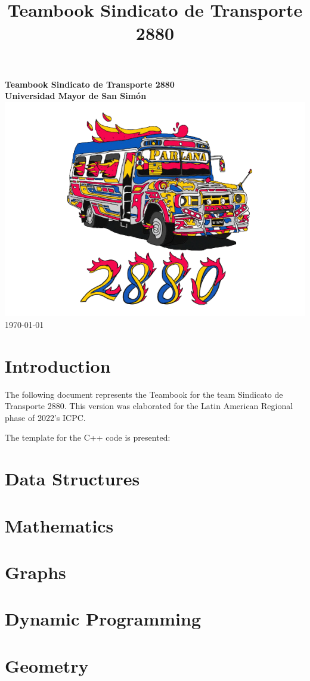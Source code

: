 \documentclass[landscape,twocolumn, 7pt, letterpaper]{book}
\begin{document}
\title{Teambook Sindicato de Transporte 2880}
\begin{titlepage}
  \centering
  \vfill
  {\bfseries\Huge
  Teambook Sindicato de Transporte 2880\\
  \vspace{2cm}
  Universidad Mayor de San Simón\\
  }    
  \vfill
  \includegraphics[width=14cm]{../Figures/LogoSdT2880.png} %
  \vfill
  \LARGE{\today}
\end{titlepage}

\tableofcontents

\chapter{Introduction}

The following document represents the Teambook for the team Sindicato de Transporte 2880. This version was elaborated for the Latin American Regional phase of 2022's ICPC.

The template for the C++ code is presented:



\chapter{Data Structures}




\chapter{Mathematics}


\chapter{Graphs}


\chapter{Dynamic Programming}


\chapter{Geometry}

\end{document}
